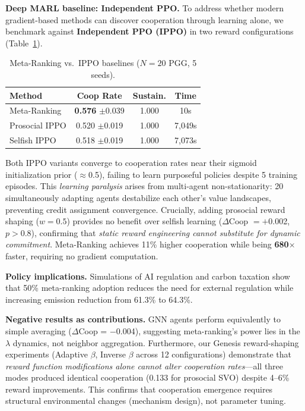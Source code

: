 \documentclass{article}
\begin{document}
\begin{sloppypar}
\textbf{Deep MARL baseline: Independent PPO.}
To address whether modern gradient-based methods can discover cooperation through learning alone, we benchmark against \textbf{Independent PPO (IPPO)} in two reward configurations (Table~\ref{tab:ippo}).
\end{sloppypar}

\begin{table}[h]
\centering
\caption{Meta-Ranking vs.\ IPPO baselines ($N{=}20$ PGG, 5 seeds).}
\label{tab:ippo}
\small
\begin{tabular}{lccc}
\toprule
\textbf{Method} & \textbf{Coop Rate} & \textbf{Sustain.} & \textbf{Time} \\
\midrule
Meta-Ranking & \textbf{0.576} {\small$\pm$0.039} & 1.000 & 10s \\
Prosocial IPPO & 0.520 {\small$\pm$0.019} & 1.000 & 7,049s \\
Selfish IPPO & 0.518 {\small$\pm$0.019} & 1.000 & 7,073s \\
\bottomrule
\end{tabular}
\end{table}

\begin{sloppypar}
Both IPPO variants converge to cooperation rates near their sigmoid initialization prior ($\approx$0.5), failing to learn purposeful policies despite 5 training episodes. This \textit{learning paralysis} arises from multi-agent non-stationarity: 20 simultaneously adapting agents destabilize each other's value landscapes, preventing credit assignment convergence. Crucially, adding prosocial reward shaping ($w{=}0.5$) provides no benefit over selfish learning ($\Delta$Coop $= +$0.002, $p{>}0.8$), confirming that \textit{static reward engineering cannot substitute for dynamic commitment}. Meta-Ranking achieves 11\% higher cooperation while being \textbf{680$\times$} faster, requiring no gradient computation.
\end{sloppypar}

\textbf{Policy implications.} Simulations of AI regulation and carbon taxation show that 50\% meta-ranking adoption reduces the need for external regulation while increasing emission reduction from 61.3\% to 64.3\%.

\textbf{Negative results as contributions.} GNN agents perform equivalently to simple averaging ($\Delta$Coop = $-$0.004), suggesting meta-ranking's power lies in the $\lambda$ dynamics, not neighbor aggregation. Furthermore, our Genesis reward-shaping experiments (Adaptive $\beta$, Inverse $\beta$ across 12 configurations) demonstrate that \textit{reward function modifications alone cannot alter cooperation rates}---all three modes produced identical cooperation (0.133 for prosocial SVO) despite 4--6\% reward improvements. This confirms that cooperation emergence requires structural environmental changes (mechanism design), not parameter tuning.
\end{document}
